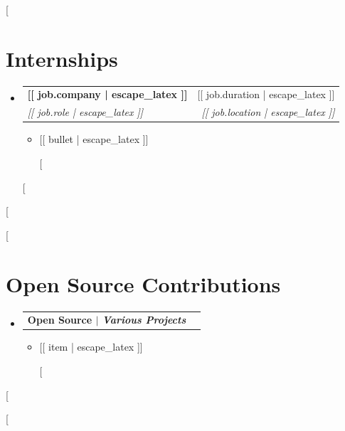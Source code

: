 \documentclass[letterpaper,11pt]{article}
\makeatletter
\newcommand{\resumeItemPlain}[1]{
  \item\small{#1 \vspace{-2pt}}
}
\newcommand{\resumeSubheading}[4]{
  \vspace{-1pt}\item
    \begin{tabular*}{0.97\textwidth}{l@{\extracolsep{\fill}}r}
      \textbf{#1} & #2 \\
      \textit{\small#3} & \textit{\small #4} \\
    \end{tabular*}\vspace{-5pt}
}
\newcommand{\resumeProjectHeading}[2]{
  \vspace{-1pt}\item
    \begin{tabular*}{0.97\textwidth}{l@{\extracolsep{\fill}}r}
      \textbf{#1} & \textit{\small #2} \\
    \end{tabular*}\vspace{-5pt}
}
\newcommand{\resumeSubHeadingListStart}{\begin{itemize}[leftmargin=*]}
\newcommand{\resumeSubHeadingListEnd}{\end{itemize}}
\newcommand{\resumeItemListStart}{\begin{itemize}}
\newcommand{\resumeItemListEnd}{\end{itemize}\vspace{-5pt}}
\makeatother
\begin{document}
[%
\section{Internships}
  \resumeSubHeadingListStart
    [%
    \resumeSubheading
      {[[ job.company | escape_latex ]]}{[[ job.duration | escape_latex ]]}
      {[[ job.role | escape_latex ]]}{[[ job.location | escape_latex ]]}
      \resumeItemListStart
        [%
        \resumeItemPlain{[[ bullet | escape_latex ]]}
        [%
      \resumeItemListEnd
    [%
  \resumeSubHeadingListEnd
\vspace{-16pt}
[%

[%
\section{Open Source Contributions}
  \resumeSubHeadingListStart
    \resumeProjectHeading
        {\textbf{Open Source} $|$ \emph{Various Projects}}{}
        \resumeItemListStart
          [%
          \resumeItemPlain{[[ item | escape_latex ]]}
          [%
        \resumeItemListEnd
  \resumeSubHeadingListEnd
[%

[%
\end{document}
